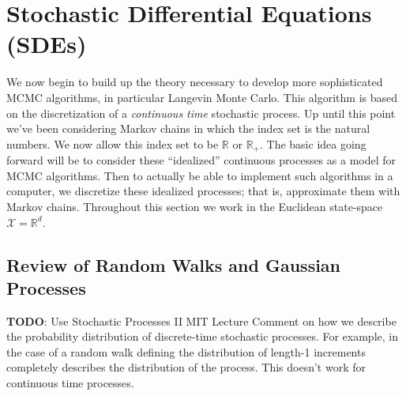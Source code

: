 \documentclass[12pt]{article}
\newcommand{\R}{\mathcal{R}}
\def\R{\mathbb{R}}
\begin{document}
\section{Stochastic Differential Equations (SDEs)}
We now begin to build up the theory necessary to develop more sophisticated MCMC algorithms, in particular Langevin Monte Carlo. This algorithm is based on the 
discretization of a \textit{continuous time} stochastic process. Up until this point we've been considering Markov chains in which the index set is the natural numbers. 
We now allow this index set to be $\R$ or $\R_+$. The basic idea going forward will be to consider these ``idealized'' continuous processes as a model for MCMC algorithms. 
Then to actually be able to implement such algorithms in a computer, we discretize these idealized processes; that is, approximate them with Markov chains. Throughout this 
section we work in the Euclidean state-space $\mathcal{X} = \R^d$. 

\subsection{Review of Random Walks and Gaussian Processes}
\textbf{TODO}: Use Stochastic Processes II MIT Lecture
Comment on how we describe the probability distribution of discrete-time stochastic processes. For example, in the case of a random walk defining the distribution of length-1
increments completely describes the distribution of the process. This doesn't work for continuous time processes. 
\end{document}
